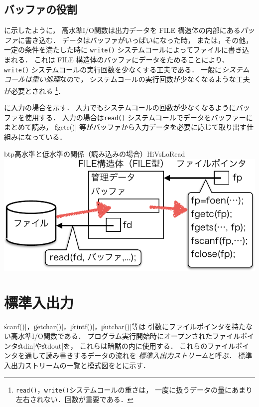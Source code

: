 \subsection{バッファの役割}
に示したように，
高水準I/O関数は出力データを FILE 構造体の内部にある{\em バッファ}に書き込む．
データはバッファがいっぱいになった時，
または，その他，一定の条件を満たした時に
\texttt{write()} システムコールによってファイルに書き込まれる．
これは FILE 構造体のバッファにデータをためることにより、
\texttt{write()} システムコールの実行回数を少なくする工夫である．
一般に{\em システムコールは重い処理}なので，
システムコールの実行回数が少なくなるような工夫が必要とされる
\footnote{\texttt{read()}，\texttt{write()}システムコールの重さは，
一度に扱うデータの量にあまり左右されない．回数が重要である．}．

に入力の場合を示す．
入力でもシステムコールの回数が少なくなるようにバッファを使用する．
入力の場合は\texttt{read()} システムコールでデータをバッファーにまとめて読み，
\|fgetc()| 等がバッファから入力データを必要に応じて取り出す仕組みになっている．

\begin{myfig}{btp}{高水準と低水準の関係（読み込みの場合）}{HiVsLoRead}
\includegraphics[scale=0.7]{Fig/HiVsLoRead-crop.pdf}
\end{myfig}

\section{標準入出力}
\|scanf()|，\|getchar()|，\|printf()|，\|putchar()|等は
引数にファイルポインタを持たない高水準I/O関数である．
プログラム実行開始時にオープンされたファイルポインタ\|stdin|や\|stdout|を，
これらは暗黙の内に使用する．
これらのファイルポインタを通して読み書きするデータの流れを
{\em 標準入出力ストリーム}と呼ぶ．
標準入出力ストリームの一覧と模式図をとに示す．

